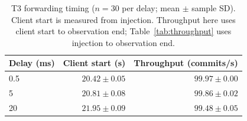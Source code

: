 \begin{table}[H]
  \centering
  \caption{T3 forwarding timing ($n=30$ per delay; mean $\pm$ sample SD). Client start is measured from injection. Throughput here uses client start to observation end; Table~\ref{tab:throughput} uses injection to observation end.}
  \label{tab:t3-timing}
  \begin{tabular}{lrr}
    \toprule
    Delay (ms) & Client start (s) & Throughput (commits/s) \\
    \midrule
    0.5 & \(20.42 \pm 0.05\) & \(99.97 \pm 0.00\) \\
    5 & \(20.81 \pm 0.08\) & \(99.86 \pm 0.02\) \\
    20 & \(21.95 \pm 0.09\) & \(99.48 \pm 0.05\) \\
    \bottomrule
  \end{tabular}
\end{table}
